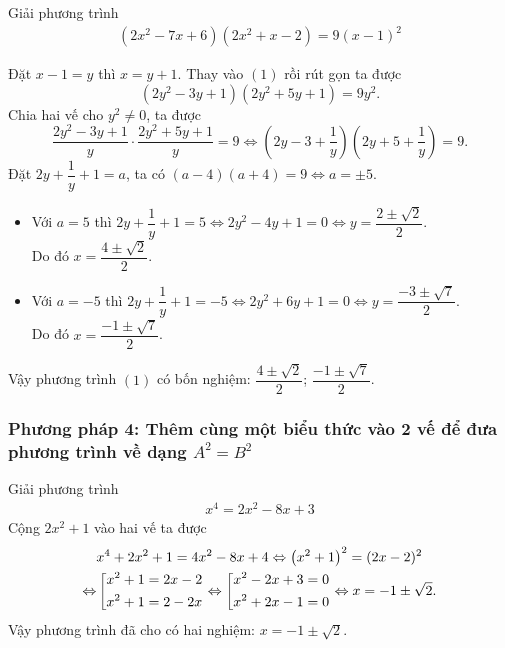 		\begin{vd}
			Giải phương trình
			\begin{align*}
				\left(2x^2-7x+6\right)\left(2x^2+x-2\right)=9(x-1)^2 \tag{1}
			\end{align*}
			\loigiai 
			{
				Đặt $x-1=y$ thì $x=y+1$. Thay vào $(1)$ rồi rút gọn ta được
				$$\left(2y^2-3y+1\right)\left(2y^2+5y+1\right)=9y^2.$$
				Chia hai vế cho $y^2 \ne 0$, ta được
				$$\dfrac{2y^2-3y+1}{y} \cdot \dfrac{2y^2+5y+1}{y} = 9 \Leftrightarrow \left(2y-3+\dfrac{1}{y}\right)\left(2y+5+\dfrac{1}{y}\right) = 9.$$
				Đặt $2y+\dfrac{1}{y} + 1 = a$, ta có $(a-4)(a+4) = 9 \Leftrightarrow a = \pm 5$.
				\begin{itemize}
					\item Với $a = 5$ thì $2y + \dfrac{1}{y} + 1 = 5 \Leftrightarrow 2y^2-4y+1=0 \Leftrightarrow y = \dfrac{2 \pm \sqrt{2}}{2}$. \\
					Do đó $x = \dfrac{4 \pm \sqrt{2}}{2}$.
					\item Với $a = -5$ thì $2y + \dfrac{1}{y} + 1 = -5 \Leftrightarrow 2y^2 + 6y + 1 = 0 \Leftrightarrow y = \dfrac{-3 \pm \sqrt{7}}{2}$. \\
					Do đó $x = \dfrac{-1 \pm \sqrt{7}}{2}$.
				\end{itemize}
				Vậy phương trình $(1)$ có bốn nghiệm: $\dfrac{4 \pm \sqrt{2}}{2}$; $\dfrac{-1 \pm \sqrt{7}}{2}$.
			}
		\end{vd}
	\subsubsection{Phương pháp 4: Thêm cùng một biểu thức vào 2 vế để đưa phương trình về dạng $A^2 = B^2$}
		\begin{vd}
			Giải phương trình
			\begin{align*}
				x^4 = 2x^2 - 8x + 3
			\end{align*}
			\loigiai 
			{
				Cộng $2x^2 + 1$ vào hai vế ta được
				\begin{align*}
					&x^4+2x^2+1=4x^2-8x+4 \Leftrightarrow \left(x^2+1\right)^2=(2x-2)^2 \\
					\Leftrightarrow &\left[\begin{aligned}&x^2+1=2x-2 \\ &x^2+1=2-2x\end{aligned}\right. \Leftrightarrow \left[\begin{aligned}&x^2-2x+3=0 \\ &x^2+2x-1=0\end{aligned}\right. \Leftrightarrow x = -1 \pm \sqrt{2}.
				\end{align*}
				Vậy phương trình đã cho có hai nghiệm: $x = -1 \pm \sqrt{2}.$
			}
		\end{vd}
